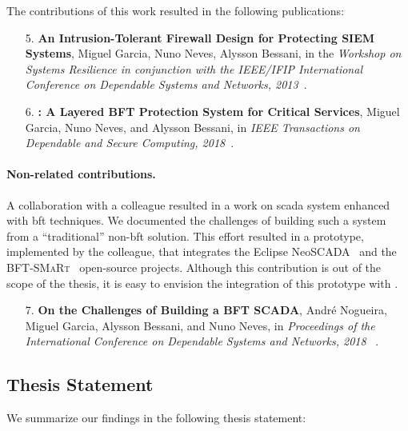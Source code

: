 The contributions of this work resulted in the following publications:

\begin{enumerate}
\item[5.] \textbf{An Intrusion-Tolerant Firewall Design for Protecting SIEM Systems}, Miguel Garcia, Nuno Neves, Alysson Bessani, in the \emph{Workshop on Systems Resilience in conjunction with the IEEE/IFIP International Conference on Dependable Systems and Networks, 2013}~\cite{Garcia:2013}.

\item[6.] \textbf{\sieveq: A Layered BFT Protection System for Critical Services}, Miguel Garcia, Nuno Neves, and Alysson Bessani, in \emph{IEEE Transactions on Dependable and Secure Computing, 2018}~\cite{Garcia:2016}.
\end{enumerate}


\paragraph{Non-related contributions.}
A collaboration with a colleague resulted in a work on \gls{scada} system enhanced with \gls{bft} techniques. 
We documented the challenges of building such a system from a ``traditional'' non-\gls{bft} solution.
This effort resulted in a prototype, implemented by the colleague, that integrates the Eclipse NeoSCADA~\cite{eclipsescada} and the \textsc{BFT-SMaRt}~\cite{Bessani:2014} open-source projects.
Although this contribution is out of the scope of the thesis, it is easy to envision the integration of this prototype with \system.


\begin{enumerate}

\item[7.] \textbf{On the Challenges of Building a BFT SCADA}, Andr\'{e} Nogueira, Miguel Garcia, Alysson Bessani, and Nuno Neves, in \emph{Proceedings of the International Conference on Dependable Systems and Networks, 2018 }~\cite{Nogueira:2018}.
\end{enumerate}


\subsection{Thesis Statement}
We summarize our findings in the following thesis statement:

\vspace{2mm}

